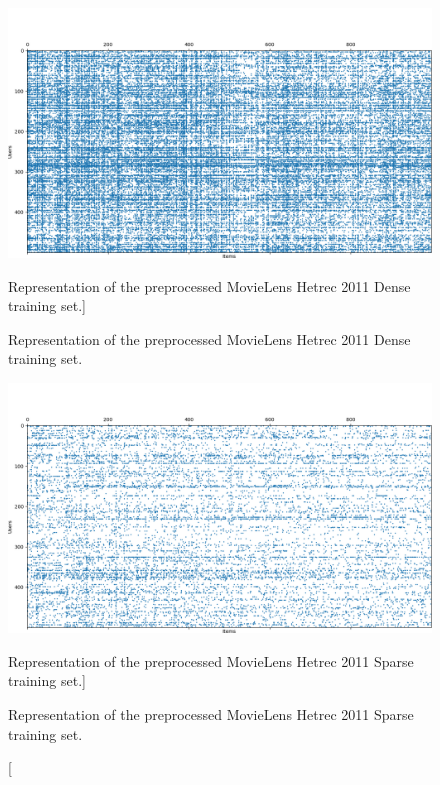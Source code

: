 \begin{figure}[htb]
  \centering
  \includegraphics[width=\textwidth]{pictures/movielens-dense-target}
  \caption
  [Representation of the preprocessed MovieLens Hetrec 2011 Dense training set.]
  {\protect\raggedright Representation of the preprocessed MovieLens Hetrec 2011 Dense training set.}
  \includegraphics[width=\textwidth]{pictures/movielens-sparse-target}
  \caption
  [Representation of the preprocessed MovieLens Hetrec 2011 Sparse training set.]
  {\protect\raggedright Representation of the preprocessed MovieLens Hetrec 2011 Sparse training set.}
\end{figure}


